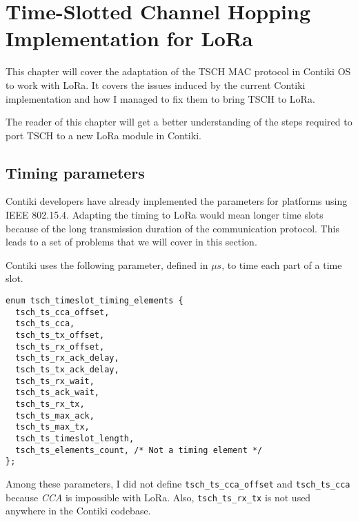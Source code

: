 \chapter{Time-Slotted Channel Hopping Implementation for LoRa\label{section:tsch}}

This chapter will cover the adaptation of the TSCH MAC protocol in Contiki OS to
work with LoRa.
It covers the issues induced by the current Contiki implementation and how I
managed to fix them to bring TSCH to LoRa.

The reader of this chapter will get a better understanding of the steps
required to port TSCH to a new LoRa module in Contiki.

\section{Timing parameters\label{section:timingparameters}}

Contiki developers have already implemented the parameters for
platforms using IEEE 802.15.4.
Adapting the timing to LoRa would mean longer time slots because of the long
transmission duration of the communication protocol.
This leads to a set of problems that we will cover in this
section.

Contiki uses the following parameter, defined in $\mu s$, to time each
part of a time slot.

\begin{lstlisting}
enum tsch_timeslot_timing_elements {
  tsch_ts_cca_offset,
  tsch_ts_cca,
  tsch_ts_tx_offset,
  tsch_ts_rx_offset,
  tsch_ts_rx_ack_delay,
  tsch_ts_tx_ack_delay,
  tsch_ts_rx_wait,
  tsch_ts_ack_wait,
  tsch_ts_rx_tx,
  tsch_ts_max_ack,
  tsch_ts_max_tx,
  tsch_ts_timeslot_length,
  tsch_ts_elements_count, /* Not a timing element */
};
\end{lstlisting}

Among these parameters, I did not define \lstinline{tsch_ts_cca_offset} and
\lstinline{tsch_ts_cca} because \emph{CCA} is impossible with LoRa.
Also, \lstinline{tsch_ts_rx_tx} is not used anywhere in the Contiki codebase.

